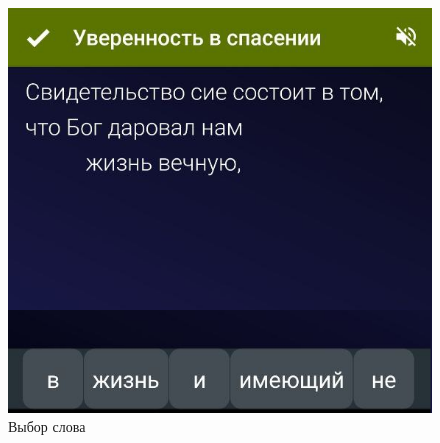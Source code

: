 \documentclass[t,aspectratio=169]{beamer}  %
\begin{document}
\begin{frame}[c]
\begin{multicols}{2}
\begin{center}
\begin{figure}
			\includegraphics[height=0.55\textheight]{remember-me-card-pick}
			\caption{Выбор слова}
			\end{figure}		
		\end{center}
	 \end{multicols}
\end{frame}
\end{document}
